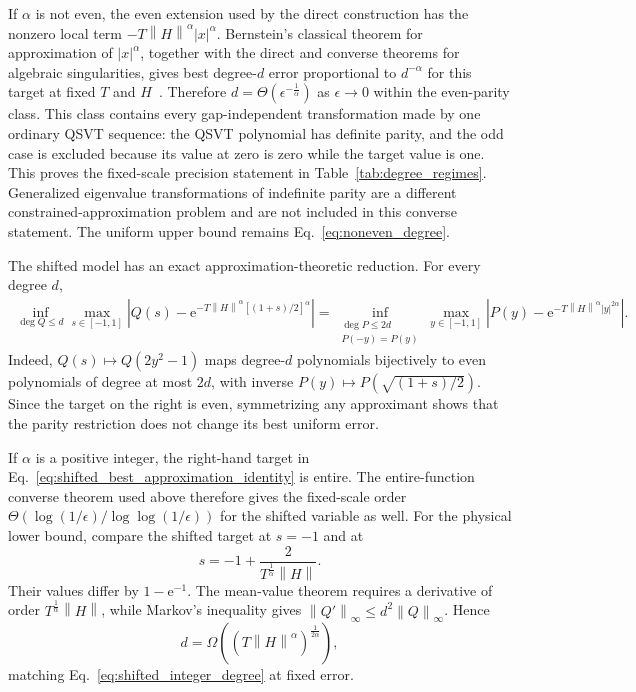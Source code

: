 \documentclass[aps,pra,reprint,floatfix,unsortedaddress,superscriptaddress]{revtex4-2}
\newcommand{\norm}[1]{\left\lVert#1\right\rVert}
\newcommand{\abs}[1]{\left\lvert#1\right\rvert}
\begin{document}
If $\alpha$ is not even, the even extension used by the direct
construction has the nonzero local term
$-T\norm{H}^{\alpha}\abs{x}^{\alpha}$.  Bernstein's classical
theorem for approximation of $\abs{x}^{\alpha}$, together with the
direct and converse theorems for algebraic singularities, gives best
degree-$d$ error proportional to $d^{-\alpha}$ for this target at
fixed $T$ and $H$~\cite{bernstein1914sur,devore1993constructive,
ditzian1987moduli}.  Therefore
$d=\Theta(\epsilon^{-\frac{1}{\alpha}})$ as
$\epsilon\to0$ within the even-parity class.  This class contains every
gap-independent transformation made by one ordinary QSVT sequence:
the QSVT polynomial has definite parity, and the odd case is excluded
because its value at zero is zero while the target value is one.  This
proves the fixed-scale precision statement in
Table~\ref{tab:degree_regimes}.  Generalized eigenvalue transformations
of indefinite parity are a different constrained-approximation problem
and are not included in this converse statement.  The uniform upper
bound remains Eq.~\eqref{eq:noneven_degree}.

The shifted model has an exact approximation-theoretic reduction.
For every degree $d$,
\begin{align}
\inf_{\deg Q\leq d}
\max_{s\in[-1,1]}
\left|
Q(s)-\mathrm e^{-T\norm{H}^{\alpha}[(1+s)/2]^\alpha}
\right|
=
\inf_{\substack{\deg P\leq2d\\P(-y)=P(y)}}
\max_{y\in[-1,1]}
\left|
P(y)-\mathrm e^{-T\norm{H}^{\alpha}\abs{y}^{2\alpha}}
\right|.
\label{eq:shifted_best_approximation_identity}
\end{align}
Indeed, $Q(s)\mapsto Q(2y^2-1)$ maps degree-$d$ polynomials
bijectively to even polynomials of degree at most $2d$, with inverse
$P(y)\mapsto P(\sqrt{(1+s)/2})$.  Since the target on the right is
even, symmetrizing any approximant shows that the parity restriction
does not change its best uniform error.

If $\alpha$ is a positive integer, the right-hand target in
Eq.~\eqref{eq:shifted_best_approximation_identity} is entire.  The
entire-function converse theorem used above therefore gives the
fixed-scale order
$\Theta(\log(1/\epsilon)/\log\log(1/\epsilon))$ for the
shifted variable as well.  For the physical lower bound, compare the
shifted target at $s=-1$ and at
\begin{equation}
    s=-1+\frac{2}{T^{\frac{1}{\alpha}}\norm{H}}.
\end{equation}
Their values differ by $1-\mathrm e^{-1}$.  The mean-value theorem
requires a derivative of order
$T^{\frac{1}{\alpha}}\norm{H}$, while Markov's inequality gives
$\norm{Q'}_\infty\leq d^2\norm{Q}_\infty$.  Hence
\begin{equation}
    d
    =
    \Omega\!\left(
    (T\norm{H}^{\alpha})^{\frac{1}{2\alpha}}
    \right),
    \label{eq:shifted_physical_lower_bound}
\end{equation}
matching Eq.~\eqref{eq:shifted_integer_degree} at fixed error.
\end{document}
